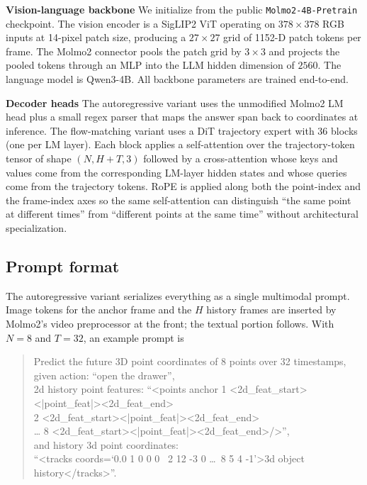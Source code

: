 \noindent\textbf{Vision-language backbone}
We initialize from the public \texttt{Molmo2-4B-Pretrain} checkpoint. The
vision encoder is a SigLIP2 ViT operating on $378{\times}378$ RGB inputs at
14-pixel patch size, producing a $27{\times}27$ grid of 1152-D patch tokens
per frame. The Molmo2 connector pools the patch grid by $3{\times}3$ and
projects the pooled tokens through an MLP into the LLM hidden dimension of
$2560$. The language model is Qwen3-4B. All backbone parameters are trained
end-to-end.


\noindent\textbf{Decoder heads}
The autoregressive variant uses the unmodified Molmo2 LM head plus a small
regex parser that maps the answer span back to coordinates at inference. The
flow-matching variant uses a DiT trajectory expert with 36 blocks (one per LM
layer). Each block applies a self-attention over the trajectory-token tensor
of shape $(N, H{+}T, 3)$ followed by a cross-attention whose keys and values
come from the corresponding LM-layer hidden states and whose queries come from
the trajectory tokens. RoPE is applied along both the point-index and the
frame-index axes so the same self-attention can distinguish ``the same point
at different times'' from ``different points at the same time'' without
architectural specialization.

\subsection{Prompt format}
\label{appsec:prompt_format}

The autoregressive variant serializes everything as a single multimodal
prompt. Image tokens for the anchor frame and the $H$ history frames are
inserted by Molmo2's video preprocessor at the front; the textual portion
follows. With $N=8$ and $T=32$, an example prompt is

\begin{quote}\small\ttfamily
Predict the future 3D point coordinates of 8 points over 32 timestamps,\\
given action: ``open the drawer'',\\
2d history point features: ``<points anchor 1 <2d\_feat\_start><|point\_feat|><2d\_feat\_end>\\
\hphantom{2d history point features: ``<points anchor }2 <2d\_feat\_start><|point\_feat|><2d\_feat\_end>\\
\hphantom{2d history point features: ``<points anchor }\ldots{} 8 <2d\_feat\_start><|point\_feat|><2d\_feat\_end>/>'',\\
and history 3d point coordinates:\\
\hphantom{and }``<tracks coords=`0.0 1 0 0 0 \ 2 12 -3 0 \ldots\ 8 5 4 -1'>3d object history</tracks>''.
\end{quote}

